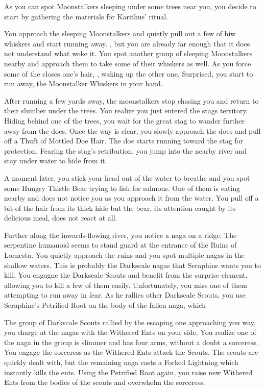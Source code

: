As you can spot Moonstalkers sleeping under some trees near you, you decide to start by gathering the materials for Karithus' ritual.

You approach the sleeping Moonstalkers and quietly pull out a few of hiw whiskers and start running away. , but you are already far enough that it does not understand what woke it. You spot another group of sleeping Moonstalkers nearby and approach them to take some of their whiskers as well. As you force some of the closes one's hair, , waking up the other one.  Surprised, you start to run away, the Moonstalker Whiskers in your hand.

After running a few yards away, the moonstalkers stop chasing you and return to their slumber under the trees. You realize you just entered the stags territory. Hiding behind one of the trees, you wait for the great stag to wander further away from the does. Once the way is clear, you slowly approach the does and pull off a Thuft of Mottled Doe Hair. The doe starts running toward the stag for protection. Fearing the stag's retribution, you jump into the nearby river and stay under water to hide from it.

A moment later, you stick your head out of the water to breathe and you spot some Hungry Thistle Bear trying to fish for salmons. One of them is eating nearby and does not notice you as you approach it from the water. You pull off a bit of the hair from its thick hide but the bear, its attention caught by its delicious meal, does not react at all.

Further along the inwards-flowing river, you notice a naga on a ridge. The serpentine humanoid seems to stand guard at the entrance of the Ruins of Lornesta. You quietly approach the ruins and you spot multiple nagas in the shallow waters. This is probably the Darkscale nagas that Seraphine wants you to kill. You engagne the Darkscale Scouts and benefit from the surprise element, allowing you to kill a few of them easily. Unfortunately, you miss one of them attempting to run away in fear. As he rallies other Darkscale Scouts, you use Seraphine's Petrified Root on the body of the fallen naga, which 

The group of Darkscale Scouts rallied by the escaping one approaching you way, you charge at the nagas with the Withered Ents on your side. You realize one of the naga in the group is slimmer and has four arms, without a doubt a sorceress. You engage the sorceress as the Withered Ents attack the Scouts. The scouts are quickly dealt with, but the remaining naga casts a Forked Lightning which instantly kills the ents. Using the Petrified Root again, you raise new Withered Ents from the bodies of the scouts and overwhelm the sorceress.

